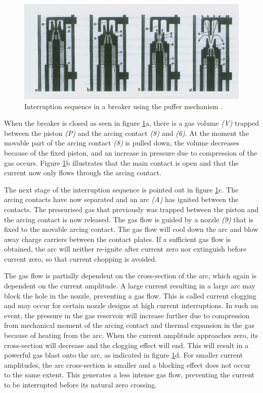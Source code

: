 \documentclass[10pt,a4paper,twoside]{article}
\begin{document}
\begin{figure} [H]
\centering
\includegraphics[scale=0.8]{Bilder/Theory/CircutBreakPuff1.png}
\caption{Interruption sequence in a breaker using the puffer mechanism \cite{bib:HVEbreak}.} \label{fig:CircutBreakPuff1}
\end{figure}

When the breaker is closed as seen in figure \ref{fig:CircutBreakPuff1}a, there is a gas volume \textit{(V)} trapped between the piston \textit{(P)} and the arcing contact \textit{(8)} and \textit{(6)}. At the moment the movable part of the arcing contact \textit{(8)} is pulled down, the volume decreases because of the fixed piston, and an increase in pressure due to compression of the gas occurs. Figure \ref{fig:CircutBreakPuff1}b illustrates that the main contact is open and that the current now only flows through the arcing contact.

The next stage of the interruption sequence is pointed out in figure \ref{fig:CircutBreakPuff1}c. The arcing contacts have now separated and an arc \textit{(A)} has ignited between the contacts. The pressurised gas that previously was trapped between the piston and the arcing contact is now released. The gas flow is guided by a nozzle \textit{(9)} that is fixed to the movable arcing contact. The gas flow will cool down the arc and blow away charge carriers between the contact plates. If a sufficient gas flow is obtained, the arc will neither re-ignite after current zero nor extinguish before current zero, so that current chopping is avoided.

The gas flow is partially dependent on the cross-section of the arc, which again is dependent on the current amplitude. A large current resulting in a large arc may block the hole in the nozzle, preventing a gas flow. This is called current clogging and may occur for certain nozzle designs at high current interruptions. In such an event, the pressure in the gas reservoir will increase further due to compression from mechanical moment of the arcing contact and thermal expansion in the gas because of heating from the arc. When the current amplitude approaches zero, its cross-section will decrease and the clogging effect will end. This will result in a powerful gas blast onto the arc, as indicated in figure \ref{fig:CircutBreakPuff1}d. For smaller current amplitudes, the arc cross-section is smaller and a blocking effect does not occur to the same extent. This generates a less intense gas flow, preventing the current to be interrupted before its natural zero crossing.
 
\end{document}
